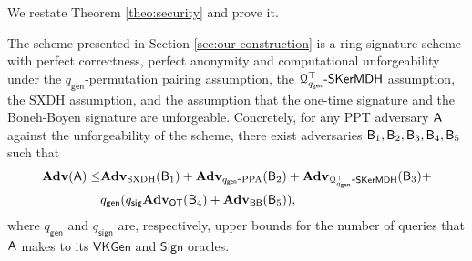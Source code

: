 
We restate Theorem \ref{theo:security} and prove it.
\begin{theorem}
The scheme presented in Section \ref{sec:our-construction} is a ring signature scheme
with perfect correctness, perfect anonymity and computational unforgeability under the
$q_\mathsf{gen}$-permutation pairing assumption, the $\mathcal{Q}_{q_\mathsf{gen}}^\top\mbox{-}\mathsf{SKerMDH}$ assumption, the $\mathrm{SXDH}$ assumption, and the assumption
that the one-time signature and the Boneh-Boyen signature are unforgeable.
Concretely, for any PPT adversary $\mathsf{A}$ against the unforgeability of the scheme, there exist adversaries $\mathsf{B}_1,\mathsf{B}_2,\mathsf{B}_3,\mathsf{B}_4,\mathsf{B}_5$ such that
\begin{align*}
\mathbf{Adv}(\mathsf{A})\leq &\mathbf{Adv}_{\mathrm{SXDH}}(\mathsf{B}_1)+\mathbf{Adv}_{q_\mathsf{gen}\mbox{-}\mathrm{PPA}}(\mathsf{B}_2)+\mathbf{Adv}_{\mathcal{Q}^\top_{q_\mathsf{gen}}\mbox{-}\mathsf{SKerMDH}}(\mathsf{B}_3)+\\
&q_\mathsf{gen}(q_\mathsf{sig}\mathbf{Adv}_{\mathsf{OT}}(\mathsf{B}_4)+\mathbf{Adv}_{\mathsf{BB}}(\mathsf{B}_5)),
\end{align*}
where $q_\mathsf{gen}$ and $q_\mathsf{sign}$ are, respectively, upper bounds for the number of queries that $\mathsf{A}$ makes to its $\mathsf{VKGen}$ and $\mathsf{Sign}$ oracles.
\end{theorem}

